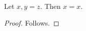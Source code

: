 \begin{proposition}\label{notion_relation_fixed_header_negative}
    Let $x,y=z$.
    Then $x=x$.
\end{proposition}
\begin{proof}
    Follows.
\end{proof}
